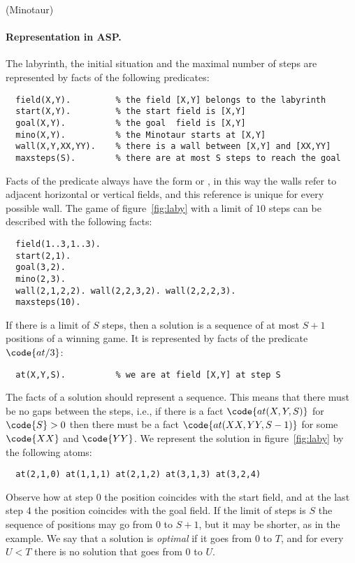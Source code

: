 \documentclass[a4paper,12pt]{article}
\begin{document}
\begin{PraktikumsAufgabe}{3}{(Minotaur)}
\paragraph{Representation in ASP.}
The labyrinth, the initial situation 
and the maximal number of steps are represented by facts of the following predicates:
\begin{verbatim}
  field(X,Y).         % the field [X,Y] belongs to the labyrinth
  start(X,Y).         % the start field is [X,Y]
  goal(X,Y).          % the goal  field is [X,Y]
  mino(X,Y).          % the Minotaur starts at [X,Y]
  wall(X,Y,XX,YY).    % there is a wall between [X,Y] and [XX,YY]
  maxsteps(S).        % there are at most S steps to reach the goal
\end{verbatim}
Facts of the predicate  always have the form 
 or , 
in this way the walls refer to adjacent horizontal or vertical fields, 
and this reference is unique for every possible wall.
The game of figure~\ref{fig:laby} with a limit of $10$ steps can be 
described with the following facts:
\begin{verbatim}
  field(1..3,1..3).
  start(2,1).
  goal(3,2).
  mino(2,3).
  wall(2,1,2,2). wall(2,2,3,2). wall(2,2,2,3).
  maxsteps(10).
\end{verbatim}

\noindent
If there is a limit of $S$ steps,
then a solution is a sequence of at most $S+1$ positions of a winning game. 
It is represented by facts of the predicate $\code{at/3}$:
\vspace{-1.5mm}
\begin{verbatim}
  at(X,Y,S).          % we are at field [X,Y] at step S
\end{verbatim}
\vspace{-1mm}
The facts of a solution should represent a sequence.
This means that there must be no gaps between the steps, 
i.e., if there is a fact $\code{at(X,Y,S)}$ for $\code{S}>0$ then there must be a fact 
$\code{at(XX,YY,S-1)}$ for some $\code{XX}$ and $\code{YY}$.
We represent the solution in figure~\ref{fig:laby} by the following atoms: 
\vspace{-1.5mm}
\begin{verbatim}
  at(2,1,0) at(1,1,1) at(2,1,2) at(3,1,3) at(3,2,4)
\end{verbatim}
\vspace{-1mm}
Observe how at step $0$ the position coincides with the start field, 
and at the last step $4$ the position coincides with the goal field.
If the limit of steps is $S$ the sequence of positions may go from $0$ to $S+1$, 
but it may be shorter, as in the example.
We say that a solution is \emph{optimal} if it goes from $0$ to $T$,
and for every $U < T$ there is no solution that goes from $0$ to $U$.



\end{PraktikumsAufgabe}
\end{document}
